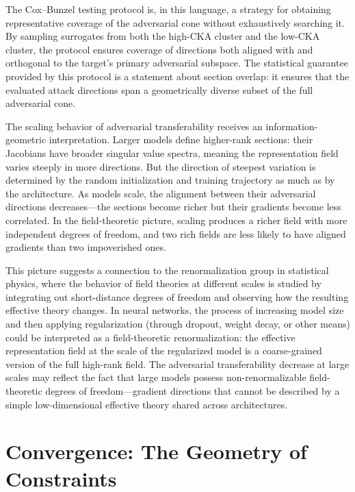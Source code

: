 \documentclass[12pt,a4paper]{article}
\theoremstyle{plain}
\theoremstyle{definition}
\begin{document}
The Cox--Bunzel testing protocol is, in this language, a strategy for obtaining representative coverage of the adversarial cone without exhaustively searching it. By sampling surrogates from both the high-CKA cluster and the low-CKA cluster, the protocol ensures coverage of directions both aligned with and orthogonal to the target's primary adversarial subspace. The statistical guarantee provided by this protocol is a statement about section overlap: it ensures that the evaluated attack directions span a geometrically diverse subset of the full adversarial cone.

The scaling behavior of adversarial transferability receives an information-geometric interpretation. Larger models define higher-rank sections: their Jacobians have broader singular value spectra, meaning the representation field varies steeply in more directions. But the direction of steepest variation is determined by the random initialization and training trajectory as much as by the architecture. As models scale, the alignment between their adversarial directions decreases---the sections become richer but their gradients become less correlated. In the field-theoretic picture, scaling produces a richer field with more independent degrees of freedom, and two rich fields are less likely to have aligned gradients than two impoverished ones.

This picture suggests a connection to the renormalization group in statistical physics, where the behavior of field theories at different scales is studied by integrating out short-distance degrees of freedom and observing how the resulting effective theory changes. In neural networks, the process of increasing model size and then applying regularization (through dropout, weight decay, or other means) could be interpreted as a field-theoretic renormalization: the effective representation field at the scale of the regularized model is a coarse-grained version of the full high-rank field. The adversarial transferability decrease at large scales may reflect the fact that large models possess non-renormalizable field-theoretic degrees of freedom---gradient directions that cannot be described by a simple low-dimensional effective theory shared across architectures.

\section{Convergence: The Geometry of Constraints}
\end{document}
